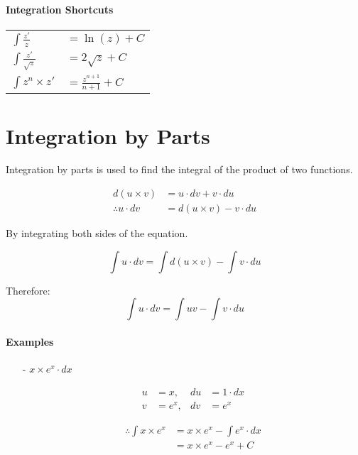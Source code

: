 \documentclass[a4paper]{book}
\begin{document}
\subsubsection{Integration Shortcuts}

\begin{center}
\begin{tabular} {l l}


  $\displaystyle{\int \frac{z'}{z}}$ & $\displaystyle{= \ln(z) + C}$ \\
  $\displaystyle{\int \frac{z'}{\sqrt{z}}}$ & $\displaystyle{= 2 \sqrt{z} + C}$ \\
  $\displaystyle{\int z^n \times z'}$ & $\displaystyle{= \frac{z^{n + 1}}{n + 1} + C}$\\

\end{tabular}
\end{center}

\chapter{Integration by Parts}

Integration by parts is used to find the integral of the product of two functions.

\begin{align*}
  d(u \times v) & = u \cdot dv + v \cdot du\\
  \therefore u \cdot dv & = d(u \times v) - v \cdot du
\end{align*}

By integrating both sides of the equation.

\[\int u \cdot dv = \int d(u \times v) - \int v \cdot du\]

Therefore:
\[\boxed{\int u \cdot dv = \int uv - \int v \cdot du}\]

\subsubsection{Examples}

\begin{itemize}

  \item[-] $\displaystyle{x \times e^x \cdot dx}$

    \begin{align*}
      u & = x, & du & = 1 \cdot dx \\
      v & = e^x, & dv & = e^x
    \end{align*}

    \begin{align*}
      \therefore \int x \times e^x & = x \times e^x - \int e^x \cdot dx \\
                                   & = x \times e^x - e^x + C
    \end{align*}

\end{itemize}
\end{document}
